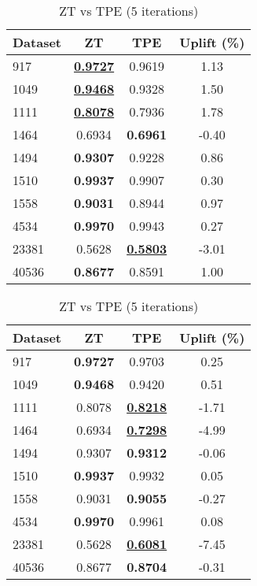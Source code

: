 \begin{table}[htbp]
\begin{center}
\begin{small}
\begin{sc}
\begin{subtable}[t]{0.48\textwidth}
    \centering
    \caption{ZT vs TPE (1 iteration)}
    \label{tab:xgboost-zt-vs-tpe-1}
    \begin{tabular}{lccc}
    \toprule
    \textbf{Dataset} & \textbf{ZT} & \textbf{TPE} & \textbf{Uplift (\%)} \\
    \midrule
    917    & \underline{\textbf{0.9727}} & 0.9619 & 1.13 \\
    1049    & \underline{\textbf{0.9468}} & 0.9328 & 1.50 \\
    1111    & \underline{\textbf{0.8078}} & 0.7936 & 1.78 \\
    1464    & 0.6934 & \textbf{0.6961} & -0.40 \\
    1494    & \textbf{0.9307} & 0.9228 & 0.86 \\
    1510    & \textbf{0.9937} & 0.9907 & 0.30 \\
    1558    & \textbf{0.9031} & 0.8944 & 0.97 \\
    4534    & \textbf{0.9970} & 0.9943 & 0.27 \\
    23381    & 0.5628 & \underline{\textbf{0.5803}} & -3.01 \\
    40536    & \textbf{0.8677} & 0.8591 & 1.00 \\
    \bottomrule
    \end{tabular}
\end{subtable}
\hfill
\begin{subtable}[t]{0.48\textwidth}
    \centering
    \caption{ZT vs TPE (5 iterations)}
    \label{tab:xgboost-zt-vs-tpe-5}
    \begin{tabular}{lccc}
    \toprule
    \textbf{Dataset} & \textbf{ZT} & \textbf{TPE} & \textbf{Uplift (\%)} \\
    \midrule
    917    & \textbf{0.9727} & 0.9703 & 0.25 \\
    1049    & \textbf{0.9468} & 0.9420 & 0.51 \\
    1111    & 0.8078 & \underline{\textbf{0.8218}} & -1.71 \\
    1464    & 0.6934 & \underline{\textbf{0.7298}} & -4.99 \\
    1494    & 0.9307 & \textbf{0.9312} & -0.06 \\
    1510    & \textbf{0.9937} & 0.9932 & 0.05 \\
    1558    & 0.9031 & \textbf{0.9055} & -0.27 \\
    4534    & \textbf{0.9970} & 0.9961 & 0.08 \\
    23381    & 0.5628 & \underline{\textbf{0.6081}} & -7.45 \\
    40536    & 0.8677 & \textbf{0.8704} & -0.31 \\
    \bottomrule
    \end{tabular}
\end{subtable}


\end{sc}
\end{small}
\end{center}
\end{table}

